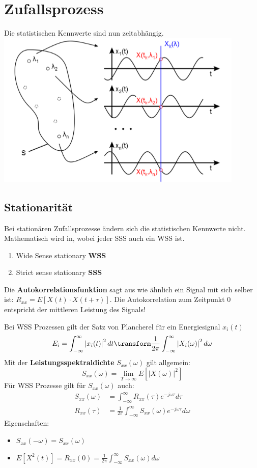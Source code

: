 \section{Zufallsprozess}
Die statistischen Kennwerte sind nun zeitabhängig.
\includegraphics[width=\columnwidth]{Images/zufallsprozess}

\subsection{Stationarität}
Bei stationären Zufallsprozesse ändern sich die statistischen Kennwerte nicht. Mathematisch wird in, wobei jeder SSS auch ein WSS ist.
\begin{enumerate}[nosep]
	\item Wide Sense stationary \textbf{WSS}
	\item Strict sense stationary \textbf{SSS}
\end{enumerate}

Die \textbf{Autokorrelationsfunktion} sagt aus wie ähnlich ein Signal mit sich selber ist: $R_{xx} = E\left[X(t)\cdot X(t+ \tau)\right]$. Die Autokorrelation zum Zeitpunkt 0 entspricht der mittleren Leistung des Signals!

Bei WSS Prozessen gilt der Satz von Plancherel für ein Energiesignal $x_i(t)$
\[
E_i = \int_{-\infty}^{\infty}\left|x_i(t)\right|^2dt \transform \frac{1}{2\pi}\int_{-\infty}^{\infty}\left|X_i(\omega)\right|^2d\omega
\]
Mit der \textbf{Leistungsspektraldichte} $S_{xx}(\omega)$ gilt allgemein:
\[
S_{xx}(\omega) = \lim\limits_{T\rightarrow\infty}E\left[\left|X(\omega)\right|^2\right]
\]
Für WSS Prozesse gilt für $S_{xx}(\omega)$ auch:
\begin{align*}
	S_{xx}(\omega) &= \int_{-\infty}^{\infty}R_{xx}(\tau)e^{-j\omega\tau}d\tau \\
	R_{xx}(\tau) &= \frac{1}{2\pi} \int_{-\infty}^{\infty}S_{xx}(\omega)e^{-j\omega\tau}d\omega
\end{align*}
Eigenschaften:
\begin{itemize}[nosep]
	\item $S_{xx}(-\omega) = S_{xx}(\omega)$
	\item $E\left[X^2(t)\right] = R_{xx}(0) = \frac{1}{2\pi}\int_{-\infty}^{\infty}S_{xx}(\omega)d\omega$
\end{itemize}

